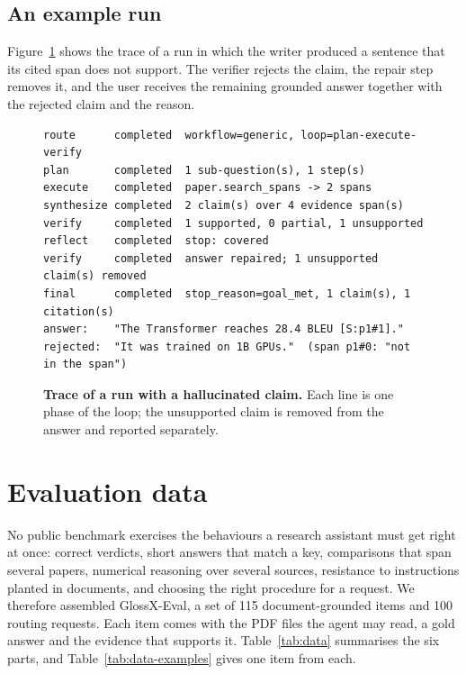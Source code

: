 \documentclass{article}
\newcommand{\sysname}{GlossX}
\begin{document}
\subsection{An example run}
Figure~\ref{fig:trace} shows the trace of a run in which the writer produced a sentence that its cited span does not support. The verifier rejects the claim, the repair step removes it, and the user receives the remaining grounded answer together with the rejected claim and the reason.

\begin{figure}[h]
\begin{lstlisting}
route      completed  workflow=generic, loop=plan-execute-verify
plan       completed  1 sub-question(s), 1 step(s)
execute    completed  paper.search_spans -> 2 spans
synthesize completed  2 claim(s) over 4 evidence span(s)
verify     completed  1 supported, 0 partial, 1 unsupported
reflect    completed  stop: covered
verify     completed  answer repaired; 1 unsupported claim(s) removed
final      completed  stop_reason=goal_met, 1 claim(s), 1 citation(s)
answer:    "The Transformer reaches 28.4 BLEU [S:p1#1]."
rejected:  "It was trained on 1B GPUs."  (span p1#0: "not in the span")
\end{lstlisting}
\vspace{-6pt}
\caption{\textbf{Trace of a run with a hallucinated claim.} Each line is one phase of the loop; the unsupported claim is removed from the answer and reported separately.}
\label{fig:trace}
\end{figure}

\section{Evaluation data}
\label{sec:data}

No public benchmark exercises the behaviours a research assistant must get right at once: correct verdicts, short answers that match a key, comparisons that span several papers, numerical reasoning over several sources, resistance to instructions planted in documents, and choosing the right procedure for a request. We therefore assembled \sysname{}-Eval, a set of 115 document-grounded items and 100 routing requests. Each item comes with the PDF files the agent may read, a gold answer and the evidence that supports it. Table~\ref{tab:data} summarises the six parts, and Table~\ref{tab:data-examples} gives one item from each.
\end{document}
